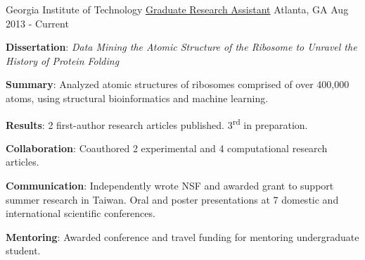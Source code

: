 

\begin{cventries}

  \cventry
    {Georgia Institute of Technology} %
    {\href{https://scholar.google.com/citations?hl=en&user=KIFFrX4AAAAJ&view_op=list_works&gmla=AJsN-F6ZS9ZeLqMG4o6JCZS87HLjoP76wA4kFValw4xx0A6ZWJJoxCWe2xu6VZvt_LgEw9YpCglVTlKY_5PfKpxiyghYFxLPNm5zrUwdBE5Fn-Sr098nt7NJGM2cH5l47IrTsSra8Vob}{Graduate Research Assistant}} %
    {Atlanta, GA} %
    {Aug 2013 - Current} %
    {{\textbf{Dissertation}: \textit{Data Mining the Atomic Structure of the Ribosome to Unravel the History of Protein Folding}}
      \begin{cvitems} %
      \vspace{4.0mm}
        \item \textbf{Summary}: Analyzed atomic structures of ribosomes comprised of over 400,000 atoms, using structural bioinformatics and machine learning. 
        \item \textbf{Results}: 2 first-author research articles published. 3\textsuperscript{rd} in preparation.
        \item \textbf{Collaboration}: Coauthored 2 experimental and 4 computational research articles.
        \item \textbf{Communication}: Independently wrote NSF and awarded grant to support summer research in Taiwan. Oral and poster presentations at 7 domestic and international scientific conferences.
        \item \textbf{Mentoring}: Awarded conference and travel funding for mentoring undergraduate student.
      \end{cvitems}
    }


\end{cventries}
